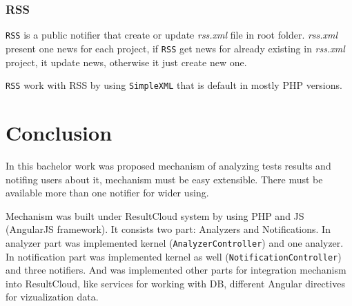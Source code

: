 \subsection{RSS}

\texttt{RSS} is a public notifier that create or update \emph{rss.xml} file in root folder. \emph{rss.xml} present one news for each project, if \texttt{RSS} get news for already existing in \emph{rss.xml} project, it update news, otherwise it just create new one.

\texttt{RSS} work with RSS by using \texttt{SimpleXML} that is default in mostly PHP versions.

\chapter{Conclusion}

In this bachelor work was proposed mechanism of analyzing tests results and notifing users about it, mechanism must be easy extensible. There must be available more than one notifier for wider using.

Mechanism was built under ResultCloud system by using PHP and JS (AngularJS framework). It consists two part: Analyzers and Notifications. In analyzer part was implemented kernel (\texttt{AnalyzerController}) and one analyzer. In notification part was implemented kernel as well (\texttt{NotificationController}) and three notifiers. And was implemented other parts for integration mechanism into ResultCloud, like services for working with DB, different Angular directives for vizualization data.

